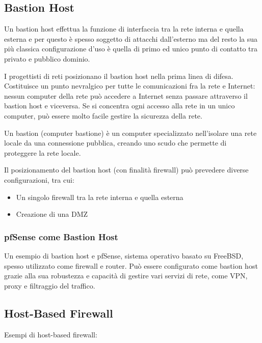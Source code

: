 \subsection{Bastion Host}

Un bastion host effettua la funzione di interfaccia tra la rete interna e quella esterna e per questo è spesso soggetto di attacchi dall'esterno ma del resto la sua più classica configurazione d'uso è quella di primo ed unico punto di contatto tra privato e pubblico dominio.

I progettisti di reti posizionano il bastion host nella prima linea di difesa. Costituisce un punto nevralgico per tutte le comunicazioni fra la rete e Internet: nessun computer della rete può accedere a Internet senza passare attraverso il bastion host e viceversa. Se si concentra ogni accesso alla rete in un unico computer, può essere molto facile gestire la sicurezza della rete.

Un bastion (computer bastione) è un computer specializzato nell'isolare una rete locale da una connessione pubblica, creando uno scudo che permette di proteggere la rete locale.

Il posizionamento del bastion host (con finalità firewall) può prevedere diverse configurazioni, tra cui:

\begin{itemize}
    \item Un singolo firewall tra la rete interna e quella esterna
    \item Creazione di una DMZ
\end{itemize}

\subsubsection{pfSense come Bastion Host}

Un esempio di bastion host e pfSense, sistema operativo basato su FreeBSD, spesso utilizzato come firewall e router. Può essere configurato come bastion host grazie alla sua robustezza e capacità di gestire vari servizi di rete, come VPN, proxy e filtraggio del traffico.

\subsection{Host-Based Firewall}

Esempi di host-based firewall:

